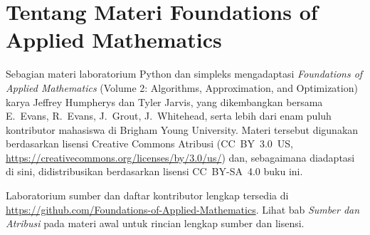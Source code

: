 \section*{Tentang Materi Foundations of Applied Mathematics}

Sebagian materi laboratorium Python dan simpleks mengadaptasi \emph{Foundations of
Applied Mathematics} (Volume 2: Algorithms, Approximation, and
Optimization) karya Jeffrey Humpherys dan Tyler Jarvis, yang dikembangkan bersama
E.~Evans, R.~Evans, J.~Grout, J.~Whitehead, serta lebih dari enam puluh kontributor
mahasiswa di Brigham Young University. Materi tersebut digunakan berdasarkan
lisensi Creative Commons Atribusi (CC~BY~3.0~US,
\url{https://creativecommons.org/licenses/by/3.0/us/}) dan, sebagaimana diadaptasi
di sini, didistribusikan berdasarkan lisensi CC~BY-SA~4.0 buku ini.

Laboratorium sumber dan daftar kontributor lengkap tersedia di
\url{https://github.com/Foundations-of-Applied-Mathematics}. Lihat bab
\emph{Sumber dan Atribusi} pada materi awal untuk rincian lengkap sumber dan lisensi.
